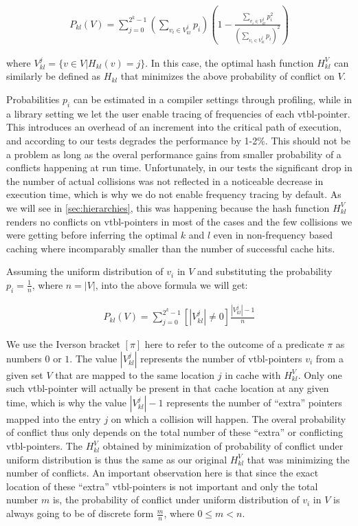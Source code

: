 \begin{eqnarray*}
P_{kl}(V)=\sum\limits_{j=0}^{2^k-1}(\sum\limits_{v_{i} \in V^j_{kl}}p_{i})(1-\frac{\sum\limits_{v_i \in V^j_{kl}}p_i^2}{(\sum\limits_{v_{i} \in V^j_{kl}}p_{i})^2})
\end{eqnarray*}

\noindent 
where $V^j_{kl}=\{v \in V | H_{kl}(v)=j\}$. In this case, the optimal hash 
function $H_{kl}^V$ can similarly be defined as $H_{kl}$ that minimizes the 
above probability of conflict on $V$.

Probabilities $p_i$ can be estimated in a compiler settings through profiling, 
while in a library setting we let the user enable tracing of frequencies of 
each vtbl-pointer. This introduces an overhead of an increment into the critical 
path of execution, and according to our tests degrades the performance by 1-2\%. 
This should not be a problem as long as the overal performance gains from 
smaller probability of a conflicts happening at run time. Unfortunately, in our 
tests the significant drop in the number of actual collisions was not reflected 
in a noticeable decrease in execution time, which is why we do not enable 
frequency tracing by default. As we will see in \textsection\ref{sec:hierarchies}, 
this was happening because the hash function $H_{kl}^V$ renders no conflicts on 
vtbl-pointers in most of the cases and the few collisions we were getting before 
inferring the optimal $k$ and $l$ even in non-frequency based caching where 
incomparably smaller than the number of successful cache hits.

Assuming the uniform distribution of $v_i$ in $V$ and substituting the probability 
$p_i=\frac{1}{n}$, where $n=|V|$, into the above formula we will get:

\begin{eqnarray*}
P_{kl}(V)=\sum\limits_{j=0}^{2^k-1}[|V^j_{kl}| \neq 0]\frac{|V^j_{kl}|-1}{n}
\end{eqnarray*}

\noindent
We use the Iverson bracket $[\pi]$ here to refer to the outcome of a predicate $\pi$ as numbers $0$ or $1$.
The value $|V^j_{kl}|$ represents the number of vtbl-pointers $v_i$ from a given 
set $V$ that are mapped to the same location $j$ in cache with $H_{kl}^V$. Only 
one such vtbl-pointer will actually be present in that cache location at any given 
time, which is why the value $|V^j_{kl}|-1$ represents the number of ``extra'' 
pointers mapped into the entry $j$ on which a collision will happen. The overal 
probability of conflict thus only depends on the total number of these ``extra'' 
or conflicting vtbl-pointers. The $H_{kl}^V$ obtained by minimization of 
probability of conflict under uniform distribution is thus the same as our 
original $H_{kl}^V$ that was minimizing the number of conflicts. An important 
observation here is that since the exact location of these ``extra'' 
vtbl-pointers is not important and only the total number $m$ is, the probability 
of conflict under uniform distribution of $v_i$ in $V$ is always going to be of 
discrete form $\frac{m}{n}$, where $0 \le m < n$.

